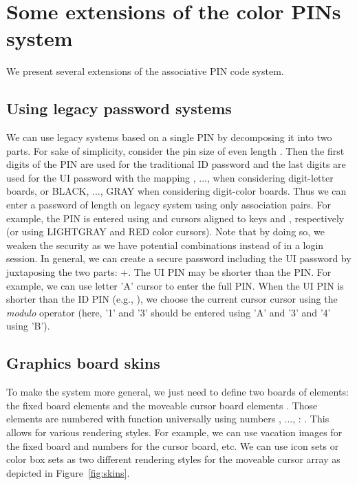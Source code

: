 \documentclass[12pt,onecolumn]{article}
\begin{document}
    
\section{Some extensions of the color PINs system\label{sec:ext}}


We present several extensions of the associative PIN code system.

\subsection{Using legacy password systems}

We can use legacy systems based on a single PIN by decomposing it into two parts.
For sake of simplicity, consider the pin size of even length .
Then the first  digits of the PIN are used for the traditional ID password and the last  digits are used for the UI password with the mapping , ...,  when considering digit-letter boards, or  BLACK, ...,  GRAY when considering digit-color boards.
Thus we can enter a password of length  on legacy system using only  association pairs.
For example, the PIN  is entered using  and  cursors aligned to keys  and , respectively (or using LIGHTGRAY and RED color cursors).
Note that by doing so, we weaken the security as we have  potential combinations instead of  in a login session.
In general, we can create a secure password including the UI password by juxtaposing the two parts: +.
The UI PIN may be shorter than the PIN. For example, we can use letter 'A' cursor to enter the full PIN. 
When the UI PIN is shorter than the ID PIN (e.g., ), we choose the current cursor cursor using the {\em modulo} operator (here, '1' and '3' should be entered using 'A' and '3' and '4' using 'B').


\subsection{Graphics board skins\label{sec:skin}}

To make the system more general, we just need to define two boards of  elements: the fixed board elements  and the moveable cursor board elements .
Those elements are numbered with function  universally using numbers , ..., : .
This allows for various rendering styles.
For example, we can use vacation images\cite{PassImage-2012} for the fixed board and numbers for the cursor board, etc.
We can use icon sets or color box sets as two different rendering styles for the moveable cursor array as depicted in Figure~\ref{fig:skins}.
\end{document}
